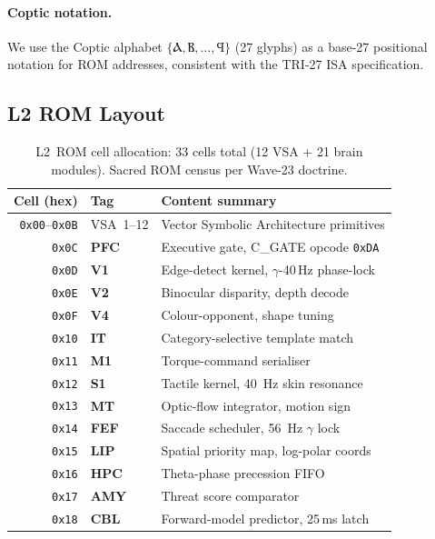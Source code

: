 \paragraph{Coptic notation.}
We use the Coptic alphabet $\{\text{Ⲁ}, \text{Ⲃ}, \ldots, \text{Ϥ}\}$
(27 glyphs) as a base-27 positional notation for ROM addresses,
consistent with the TRI-27 ISA specification.

\subsection{L2 ROM Layout}
\label{sec:73:l2-rom-layout}

\begin{table}[H]
\centering
\caption{L2~ROM cell allocation: 33 cells total
         (12 VSA $+$ 21 brain modules). Sacred ROM census per
         Wave-23 doctrine.}
\label{tab:73:l2-rom}
\small
\begin{tabular}{rll}
\toprule
Cell (hex) & Tag & Content summary \\
\midrule
\texttt{0x00}--\texttt{0x0B} & VSA~1--12  & Vector Symbolic Architecture primitives \\
\texttt{0x0C} & \textbf{PFC}  & Executive gate, C\_GATE opcode \texttt{0xDA} \\
\texttt{0x0D} & \textbf{V1}   & Edge-detect kernel, $\gamma$-40\,Hz phase-lock \\
\texttt{0x0E} & \textbf{V2}   & Binocular disparity, depth decode \\
\texttt{0x0F} & \textbf{V4}   & Colour-opponent, shape tuning \\
\texttt{0x10} & \textbf{IT}   & Category-selective template match \\
\texttt{0x11} & \textbf{M1}   & Torque-command serialiser \\
\texttt{0x12} & \textbf{S1}   & Tactile kernel, 40~Hz skin resonance \\
\texttt{0x13} & \textbf{MT}   & Optic-flow integrator, motion sign \\
\texttt{0x14} & \textbf{FEF}  & Saccade scheduler, 56~Hz $\gamma$ lock \\
\texttt{0x15} & \textbf{LIP}  & Spatial priority map, log-polar coords \\
\texttt{0x16} & \textbf{HPC}  & Theta-phase precession FIFO \\
\texttt{0x17} & \textbf{AMY}  & Threat score comparator \\
\texttt{0x18} & \textbf{CBL}  & Forward-model predictor, 25\,ms latch \\

\end{tabular}
\end{table}
